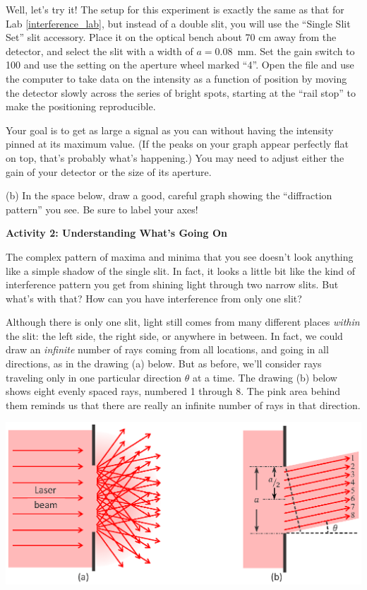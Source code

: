 Well, let's try it!  The setup for this experiment is exactly the same as that for Lab \ref{interference_lab},  but instead of a double slit, you will use the ``Single Slit Set'' slit accessory.  Place it on the optical bench about 70 cm away from the detector, and select the slit with a width of $a = 0.08$~mm.   Set the gain switch to 100 and use the setting on the aperture wheel marked ``4''.   Open the file  and use the computer to take data on the intensity as a function of position by moving the detector slowly across the series of bright spots, starting at the ``rail stop'' to make the positioning reproducible.  

Your goal is to get as large a signal as you can without having the intensity pinned at its maximum value.  (If the peaks on your graph appear perfectly flat on top, that's probably what's happening.) You may need to adjust either the gain of your detector or the size of its aperture.

(b) In the space below, draw a good, careful graph showing the ``diffraction pattern'' you see.  
Be sure to label your axes!
\answerspace{1.5in}

\pagebreak[2]
\textbf{Activity 2: Understanding What's Going On}

The complex pattern of maxima and minima that you see doesn't look anything like a simple shadow of the single slit.  In fact, it looks a little bit like the kind of interference pattern you get from shining light through two narrow slits.  But what's with that?  How can you have interference from only one slit?

Although there is only one slit, light still comes from many different places \textit{within} the slit: the left side, the right side, or anywhere in between.  In fact, we could draw an \textit{infinite} number of rays coming from all locations, and going in all directions, as in the drawing (a) below.  But as before, we'll consider rays traveling only in one particular direction $\theta$ at a time.  The drawing (b) below shows eight evenly spaced rays, numbered 1 through 8.  The pink area behind them reminds us that there are really an infinite number of rays in that direction.

\answerspace{0.2in}
\begin{center}
\includegraphics{diffraction_of_light/one_slit_rays_color.eps}
\end{center}
\answerspace{0.2in}

